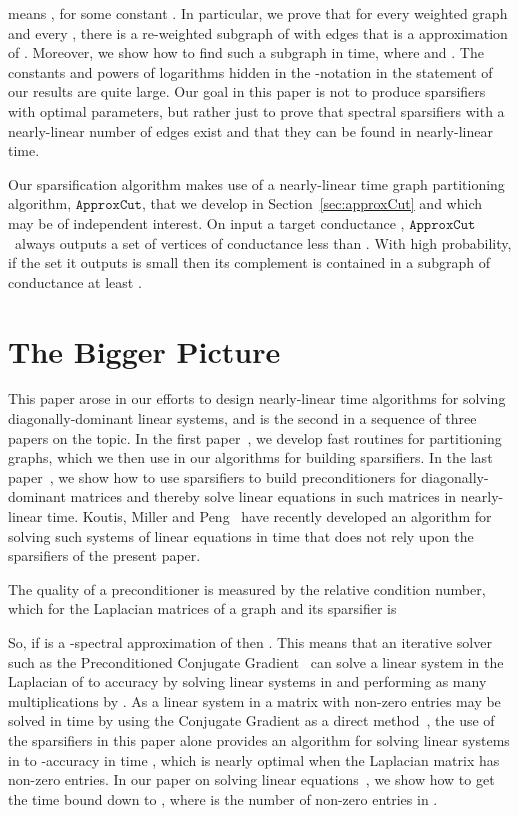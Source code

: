 \documentclass[11pt]{article}
\newcommand{\approxcut}{\ensuremath{\mathtt{ApproxCut}}}
\begin{document}
  means , for some constant .
In particular, we prove that for every weighted graph  and every
  , there is a re-weighted subgraph of  with  edges
  that is a  approximation of .
Moreover, we show how to  find such
  a subgraph in  time, where  and .
The constants and powers of logarithms
  hidden in the -notation
  in the statement of our results are quite large.
Our goal in this paper is not to produce sparsifiers with optimal parameters, but
  rather just to prove
  that spectral sparsifiers with a nearly-linear number of edges exist and
  that they can be found in nearly-linear time.

Our sparsification algorithm makes use of a nearly-linear time
  graph partitioning algorithm, \approxcut ,  that we develop in Section~\ref{sec:approxCut} and which may be of independent interest.
On input a target conductance , \approxcut \ always outputs a set of vertices
  of conductance less than .
With high probability, if the set it outputs is small then its complement
 is contained in a subgraph of conductance at least .

\section{The Bigger Picture}

This paper arose in our efforts to design nearly-linear time algorithms
  for solving diagonally-dominant linear systems, and is the second in
  a sequence of three papers on the topic.
In the first paper~\cite{SpielmanTengCuts}, we develop fast routines
  for partitioning graphs, which we then use in our algorithms for building
  sparsifiers.
In the last paper~\cite{SpielmanTengLinsolve}, we show how to use
  sparsifiers to build preconditioners for diagonally-dominant matrices
  and thereby solve linear equations in such matrices in nearly-linear time.
Koutis, Miller and Peng~\cite{KMP} have recently developed an algorithm for
  solving such systems 
  of linear equations in time 
  that does not rely upon the sparsifiers of the present paper.

The quality of a preconditioner is measured by the relative condition number,
  which for the Laplacian matrices of a graph  and its sparsifier  is

So, if  is a -spectral approximation of  then
  .
This means that
  an iterative solver such as the Preconditioned Conjugate Gradient~\cite{Axelsson}
 can solve a linear system in the Laplacian of
   to accuracy  by solving 
  linear systems in
   and performing as many multiplications by .
As a linear system in a matrix with  non-zero entries may be solved
  in time  by using the Conjugate Gradient as a
  direct method~\cite[Theorem~28.3]{TrefethenBau},
 the use of the sparsifiers in this paper alone provides an
  algorithm for solving linear systems in  to -accuracy in
  time , which is nearly optimal when
  the Laplacian matrix has  non-zero entries.
In our paper on solving linear equations~\cite{SpielmanTengLinsolve}, we show
  how to get the time bound down to ,
  where  is the number of non-zero entries in .
\end{document}
